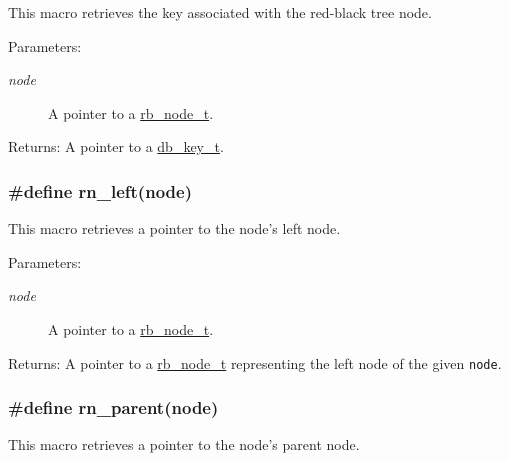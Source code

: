 This macro retrieves the key associated with the red-black tree node.

\begin{Desc}
\item[Parameters:]
\begin{description}
\item[{\em node}]A pointer to a \hyperlink{group__dbprim__rbtree_a1}{rb\_\-node\_\-t}.\end{description}
\end{Desc}
\begin{Desc}
\item[Returns:]A pointer to a \hyperlink{group__dbprim_a0}{db\_\-key\_\-t}. \end{Desc}
\hypertarget{group__dbprim__rbtree_a30}{
\subsubsection[rn\_\-left]{\setlength{\rightskip}{0pt plus 5cm}\#define rn\_\-left(node)}}
\label{group__dbprim__rbtree_a30}


This macro retrieves a pointer to the node's left node.

\begin{Desc}
\item[Parameters:]
\begin{description}
\item[{\em node}]A pointer to a \hyperlink{group__dbprim__rbtree_a1}{rb\_\-node\_\-t}.\end{description}
\end{Desc}
\begin{Desc}
\item[Returns:]A pointer to a \hyperlink{group__dbprim__rbtree_a1}{rb\_\-node\_\-t} representing the left node of the given {\tt node}. \end{Desc}
\hypertarget{group__dbprim__rbtree_a29}{
\subsubsection[rn\_\-parent]{\setlength{\rightskip}{0pt plus 5cm}\#define rn\_\-parent(node)}}
\label{group__dbprim__rbtree_a29}


This macro retrieves a pointer to the node's parent node.

